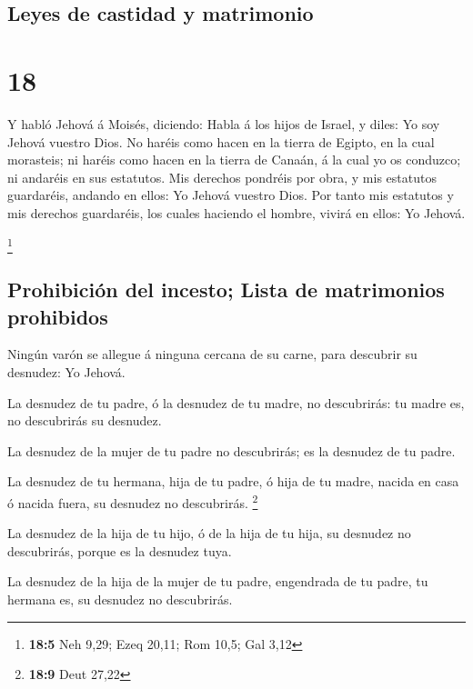\hypertarget{leyes-de-castidad-y-matrimonio}{%
\subsection{Leyes de castidad y
matrimonio}\label{leyes-de-castidad-y-matrimonio}}

\hypertarget{section-17}{%
\section{18}\label{section-17}}

 Y habló Jehová á Moisés, diciendo:  Habla á
los hijos de Israel, y diles: Yo soy Jehová vuestro Dios. 
No haréis como hacen en la tierra de Egipto, en la cual morasteis; ni
haréis como hacen en la tierra de Canaán, á la cual yo os conduzco; ni
andaréis en sus estatutos.  Mis derechos pondréis por
obra, y mis estatutos guardaréis, andando en ellos: Yo Jehová vuestro
Dios.  Por tanto mis estatutos y mis derechos guardaréis,
los cuales haciendo el hombre, vivirá en ellos: Yo Jehová.

\footnote{\textbf{18:5} Neh 9,29; Ezeq 20,11; Rom 10,5; Gal 3,12}

\hypertarget{prohibiciuxf3n-del-incesto-lista-de-matrimonios-prohibidos}{%
\subsection{Prohibición del incesto; Lista de matrimonios
prohibidos}\label{prohibiciuxf3n-del-incesto-lista-de-matrimonios-prohibidos}}

 Ningún varón se allegue á ninguna cercana de su carne,
para descubrir su desnudez: Yo Jehová.

 La desnudez de tu padre, ó la desnudez de tu madre, no
descubrirás: tu madre es, no descubrirás su desnudez.

 La desnudez de la mujer de tu padre no descubrirás; es la
desnudez de tu padre.

 La desnudez de tu hermana, hija de tu padre, ó hija de tu
madre, nacida en casa ó nacida fuera, su desnudez no descubrirás.
\footnote{\textbf{18:9} Deut 27,22}

 La desnudez de la hija de tu hijo, ó de la hija de tu
hija, su desnudez no descubrirás, porque es la desnudez tuya.

 La desnudez de la hija de la mujer de tu padre,
engendrada de tu padre, tu hermana es, su desnudez no descubrirás.

